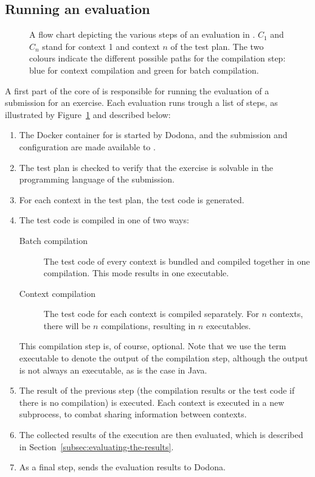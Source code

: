 \documentclass[5p,number]{elsarticle}
\begin{document}
    \subsection{Running an evaluation}\label{subsec:running-an-evaluation}

    \begin{figure}
        \centering
        
        \caption{
        A flow chart depicting the various steps of an evaluation in \tested{}.
        $C_1$ and $C_n$ stand for context 1 and context $n$ of the test plan.
        The two colours indicate the different possible paths for the compilation step: blue for context compilation and green for batch compilation.
        }
        \label{fig:tested-flow}
    \end{figure}

    A first part of the core of \tested{} is responsible for running the evaluation of a submission for an exercise.
    Each evaluation runs trough a list of steps, as illustrated by Figure~\ref{fig:tested-flow} and described below:

    \begin{enumerate}
        \item The Docker container for \tested{} is started by Dodona, and the submission and configuration are made available to \tested{}.
        \item The test plan is checked to verify that the exercise is solvable in the programming language of the submission.
        \item For each context in the test plan, the test code is generated.
        \item The test code is compiled in one of two ways:
        \begin{description}
            \item[Batch compilation] The test code of every context is bundled and compiled together in one compilation.
            This mode results in one executable.
            \item[Context compilation] The test code for each context is compiled separately.
            For $n$ contexts, there will be $n$ compilations, resulting in $n$ executables.
        \end{description}
        This compilation step is, of course, optional.
        Note that we use the term executable to denote the output of the compilation step, although the output is not always an executable, as is the case in Java.
        \item The result of the previous step (the compilation results or the test code if there is no compilation) is executed.
        Each context is executed in a new subprocess, to combat sharing information between contexts.
        \item The collected results of the execution are then evaluated, which is described in Section~\ref{subsec:evaluating-the-results}.
        \item As a final step, \tested{} sends the evaluation results to Dodona.
    \end{enumerate}
    
\end{document}
